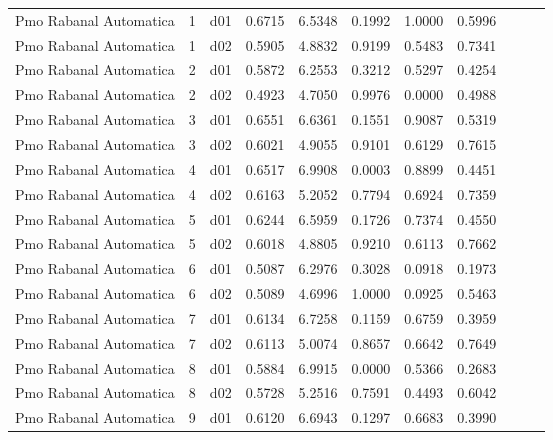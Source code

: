\begin{landscape}
\begin{longtable}{p{2cm}rrrrrrrrrr}
 Pmo Rabanal Automatica   &          1 &     d01 &   0.6715 &  6.5348 &        0.1992 &           1.0000 &  0.5996 \\
 Pmo Rabanal Automatica   &          1 &     d02 &   0.5905 &  4.8832 &        0.9199 &           0.5483 &  0.7341 \\
 Pmo Rabanal Automatica   &          2 &     d01 &   0.5872 &  6.2553 &        0.3212 &           0.5297 &  0.4254 \\
 Pmo Rabanal Automatica   &          2 &     d02 &   0.4923 &  4.7050 &        0.9976 &           0.0000 &  0.4988 \\
 Pmo Rabanal Automatica   &          3 &     d01 &   0.6551 &  6.6361 &        0.1551 &           0.9087 &  0.5319 \\
 Pmo Rabanal Automatica   &          3 &     d02 &   0.6021 &  4.9055 &        0.9101 &           0.6129 &  0.7615 \\
 Pmo Rabanal Automatica   &          4 &     d01 &   0.6517 &  6.9908 &        0.0003 &           0.8899 &  0.4451 \\
 Pmo Rabanal Automatica   &          4 &     d02 &   0.6163 &  5.2052 &        0.7794 &           0.6924 &  0.7359 \\
 Pmo Rabanal Automatica   &          5 &     d01 &   0.6244 &  6.5959 &        0.1726 &           0.7374 &  0.4550 \\
 Pmo Rabanal Automatica   &          5 &     d02 &   0.6018 &  4.8805 &        0.9210 &           0.6113 &  0.7662 \\
 Pmo Rabanal Automatica   &          6 &     d01 &   0.5087 &  6.2976 &        0.3028 &           0.0918 &  0.1973 \\
 Pmo Rabanal Automatica   &          6 &     d02 &   0.5089 &  4.6996 &        1.0000 &           0.0925 &  0.5463 \\
 Pmo Rabanal Automatica   &          7 &     d01 &   0.6134 &  6.7258 &        0.1159 &           0.6759 &  0.3959 \\
 Pmo Rabanal Automatica   &          7 &     d02 &   0.6113 &  5.0074 &        0.8657 &           0.6642 &  0.7649 \\
 Pmo Rabanal Automatica   &          8 &     d01 &   0.5884 &  6.9915 &        0.0000 &           0.5366 &  0.2683 \\
 Pmo Rabanal Automatica   &          8 &     d02 &   0.5728 &  5.2516 &        0.7591 &           0.4493 &  0.6042 \\
 Pmo Rabanal Automatica   &          9 &     d01 &   0.6120 &  6.6943 &        0.1297 &           0.6683 &  0.3990 \\

\end{longtable}
\end{landscape}

